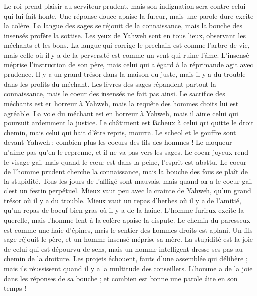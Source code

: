 \begin{multicols}{2}
Le roi prend plaisir au serviteur prudent, mais son indignation sera contre celui qui lui fait honte.
\VerseOne{}Une réponse douce apaise la fureur, mais une parole dure excite la colère.
La langue des sages se réjouit de la connaissance, mais la bouche des insensés profère la sottise.
Les yeux de Yahweh sont en tous lieux, observant les méchants et les bons.
La langue qui corrige le prochain est comme l'arbre de vie, mais celle où il y a de la perversité est comme un vent qui ruine l'âme.
L'insensé méprise l'instruction de son père, mais celui qui a égard à la réprimande agit avec prudence.
Il y a un grand trésor dans la maison du juste, mais il y a du trouble dans les profits du méchant.
Les lèvres des sages répandent partout la connaissance, mais le coeur des insensés ne fait pas ainsi.
Le sacrifice des méchants est en horreur à Yahweh, mais la requête des hommes droits lui est agréable.
La voie du méchant est en horreur à Yahweh, mais il aime celui qui poursuit ardemment la justice.
Le châtiment est fâcheux à celui qui quitte le droit chemin, mais celui qui hait d'être repris, mourra.
Le scheol et le gouffre sont devant Yahweh ; combien plus les coeurs des fils des hommes !
Le moqueur n'aime pas qu'on le reprenne, et il ne va pas vers les sages.
Le coeur joyeux rend le visage gai, mais quand le cœur est dans la peine, l'esprit est abattu.
Le coeur de l'homme prudent cherche la connaissance, mais la bouche des fous se plaît de la stupidité.
Tous les jours de l'affligé sont mauvais, mais quand on a le coeur gai, c'est un festin perpétuel.
Mieux vaut peu avec la crainte de Yahweh, qu'un grand trésor où il y a du trouble.
Mieux vaut un repas d'herbes où il y a de l'amitié, qu'un repas de boeuf bien gras où il y a de la haine.
L'homme furieux excite la querelle, mais l'homme lent à la colère apaise la dispute.
Le chemin du paresseux est comme une haie d'épines, mais le sentier des hommes droits est aplani.
Un fils sage réjouit le père, et un homme insensé méprise sa mère.
La stupidité est la joie de celui qui est dépourvu de sens, mais un homme intelligent dresse ses pas au chemin de la droiture.
Les projets échouent, faute d'une assemblée qui délibère ; mais ils réussissent quand il y a la multitude des conseillers.
L'homme a de la joie dans les réponses de sa bouche ; et combien est bonne une parole dite en son temps !

\end{multicols}

